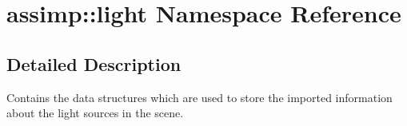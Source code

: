 \hypertarget{namespaceassimp_1_1light}{\section{assimp\+:\+:light Namespace Reference}
\label{namespaceassimp_1_1light}
}


\subsection{Detailed Description}
Contains the data structures which are used to store the imported information about the light sources in the scene. 